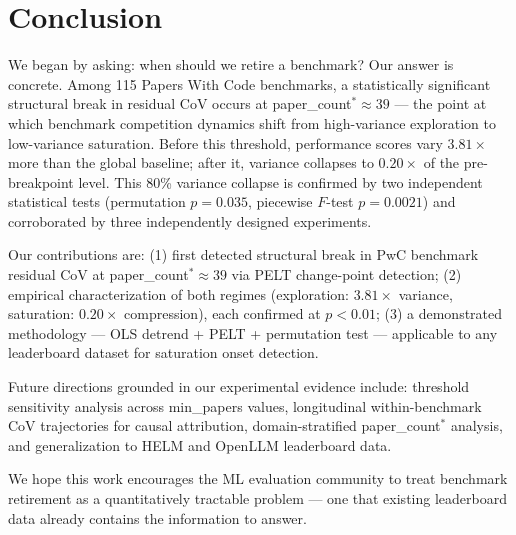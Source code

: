 \section{Conclusion}
\label{sec:conclusion}

We began by asking: when should we retire a benchmark? Our answer is concrete. Among 115 Papers With Code benchmarks, a statistically significant structural break in residual CoV occurs at paper\_count$^* \approx 39$ --- the point at which benchmark competition dynamics shift from high-variance exploration to low-variance saturation. Before this threshold, performance scores vary $3.81\times$ more than the global baseline; after it, variance collapses to $0.20\times$ of the pre-breakpoint level. This 80\% variance collapse is confirmed by two independent statistical tests (permutation $p=0.035$, piecewise $F$-test $p=0.0021$) and corroborated by three independently designed experiments.

Our contributions are: (1) first detected structural break in PwC benchmark residual CoV at paper\_count$^* \approx 39$ via PELT change-point detection; (2) empirical characterization of both regimes (exploration: $3.81\times$ variance, saturation: $0.20\times$ compression), each confirmed at $p < 0.01$; (3) a demonstrated methodology --- OLS detrend + PELT + permutation test --- applicable to any leaderboard dataset for saturation onset detection.

Future directions grounded in our experimental evidence include: threshold sensitivity analysis across min\_papers values, longitudinal within-benchmark CoV trajectories for causal attribution, domain-stratified paper\_count$^*$ analysis, and generalization to HELM and OpenLLM leaderboard data.

We hope this work encourages the ML evaluation community to treat benchmark retirement as a quantitatively tractable problem --- one that existing leaderboard data already contains the information to answer.
